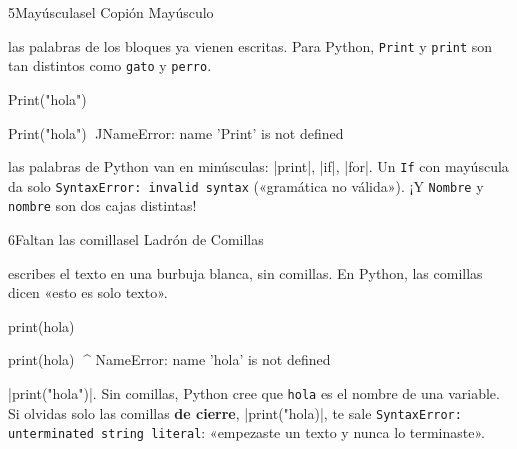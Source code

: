 \begin{bzcard}{5}{Mayúsculas}{el Copión Mayúsculo}
\noindent\begin{minipage}[c]{0.43\linewidth}
 las palabras de los bloques ya vienen escritas. Para Python, \texttt{Print} y \texttt{print} son tan distintos como \texttt{gato} y \texttt{perro}.
\end{minipage}\hfill
\begin{minipage}[c]{0.54\linewidth}
\begin{bzsnip}
Print("hola")
\end{bzsnip}
\end{minipage}\par
\begin{bzerror}
    Print("hola")
    ^^^^^
NameError: name 'Print' is not defined
\end{bzerror}
 las palabras de Python van en minúsculas: \py|print|, \py|if|, \py|for|. Un \texttt{If} con mayúscula da solo \texttt{SyntaxError: invalid syntax} («gramática no válida»). ¡Y \texttt{Nombre} y \texttt{nombre} son dos cajas distintas!
\end{bzcard}

\begin{bzcard}{6}{Faltan las comillas}{el Ladrón de Comillas}
\noindent\begin{minipage}[c]{0.43\linewidth}
 escribes el texto en una burbuja blanca, sin comillas. En Python, las comillas dicen «esto es solo texto».
\end{minipage}\hfill
\begin{minipage}[c]{0.54\linewidth}
\begin{bzsnip}
print(hola)
\end{bzsnip}
\end{minipage}\par
\begin{bzerror}
    print(hola)
          ^^^^
NameError: name 'hola' is not defined
\end{bzerror}
 \py|print("hola")|. Sin comillas, Python cree que \texttt{hola} es el nombre de una variable. Si olvidas solo las comillas \textbf{de cierre}, \py|print("hola)|, te sale \texttt{SyntaxError: unterminated string literal}: «empezaste un texto y nunca lo terminaste».
\end{bzcard}

